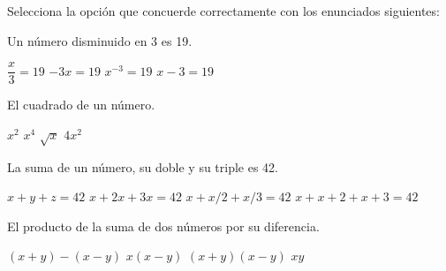 Selecciona la opción que concuerde correctamente con los enunciados siguientes:

\begin{multicols}{2}
    \begin{parts}

        Un número disminuido en 3 es 19.

        \begin{choices}
            \choice $\dfrac{x}{3}=19$
            \choice $-3x=19$
            \choice $x^{-3}=19$
            \CorrectChoice $x-3=19$
        \end{choices}

        El cuadrado de un número.

        \begin{choices}
            \CorrectChoice $x^2$
            \choice $x^4$
            \choice $\sqrt{x}$
            \choice $4x^2$
        \end{choices}

        La suma de un número, su doble y su triple es 42.

        \begin{choices}
            \choice $x + y + z = 42$
            \CorrectChoice $x + 2x + 3x = 42$
            \choice $x + x/2 + x/3 = 42$
            \choice $x + x + 2 + x + 3 = 42$
        \end{choices}

        El producto de la suma de dos números por su diferencia.

        \begin{choices}
            \choice $(x+y) - (x - y)$
            \choice $x(x - y)$
            \CorrectChoice $(x + y)(x - y)$
            \choice $xy$
        \end{choices}

    \end{parts}
\end{multicols}